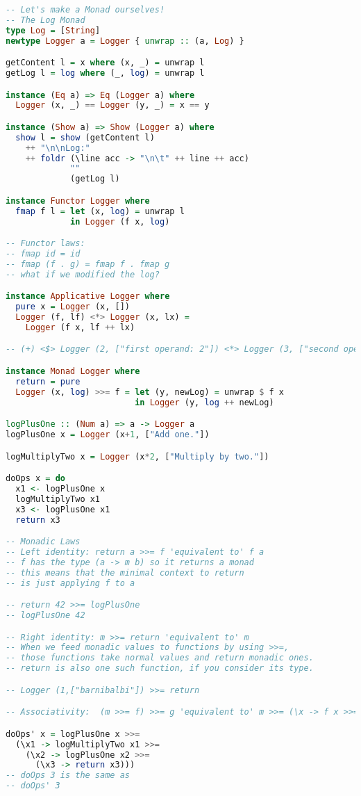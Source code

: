 \begin{lstlisting}[language=Haskell]
-- Let's make a Monad ourselves!
-- The Log Monad
type Log = [String]
newtype Logger a = Logger { unwrap :: (a, Log) }

getContent l = x where (x, _) = unwrap l
getLog l = log where (_, log) = unwrap l

instance (Eq a) => Eq (Logger a) where
  Logger (x, _) == Logger (y, _) = x == y

instance (Show a) => Show (Logger a) where
  show l = show (getContent l)
    ++ "\n\nLog:"
    ++ foldr (\line acc -> "\n\t" ++ line ++ acc)
             ""
             (getLog l)

instance Functor Logger where
  fmap f l = let (x, log) = unwrap l
             in Logger (f x, log)

-- Functor laws:
-- fmap id = id
-- fmap (f . g) = fmap f . fmap g
-- what if we modified the log?

instance Applicative Logger where
  pure x = Logger (x, [])
  Logger (f, lf) <*> Logger (x, lx) =
    Logger (f x, lf ++ lx)

-- (+) <$> Logger (2, ["first operand: 2"]) <*> Logger (3, ["second operand: 3"])

instance Monad Logger where
  return = pure
  Logger (x, log) >>= f = let (y, newLog) = unwrap $ f x
                          in Logger (y, log ++ newLog)

logPlusOne :: (Num a) => a -> Logger a
logPlusOne x = Logger (x+1, ["Add one."])

logMultiplyTwo x = Logger (x*2, ["Multiply by two."])

doOps x = do
  x1 <- logPlusOne x
  logMultiplyTwo x1
  x3 <- logPlusOne x1
  return x3

-- Monadic Laws
-- Left identity: return a >>= f 'equivalent to' f a
-- f has the type (a -> m b) so it returns a monad
-- this means that the minimal context to return 
-- is just applying f to a

-- return 42 >>= logPlusOne
-- logPlusOne 42

-- Right identity: m >>= return 'equivalent to' m
-- When we feed monadic values to functions by using >>=, 
-- those functions take normal values and return monadic ones. 
-- return is also one such function, if you consider its type.

-- Logger (1,["barnibalbi"]) >>= return

-- Associativity:  (m >>= f) >>= g 'equivalent to' m >>= (\x -> f x >>= g)

doOps' x = logPlusOne x >>=
  (\x1 -> logMultiplyTwo x1 >>=
    (\x2 -> logPlusOne x2 >>=
      (\x3 -> return x3)))
-- doOps 3 is the same as
-- doOps' 3



\end{lstlisting}
